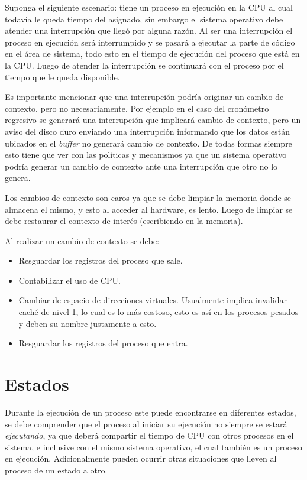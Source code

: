 Suponga el siguiente escenario: tiene un proceso en ejecución en la CPU al cual
todavía le queda tiempo del asignado, sin embargo el sistema operativo debe
atender una interrupción que llegó por alguna razón. Al ser una interrupción el
proceso en ejecución será interrumpido y se pasará a ejecutar la parte de código
en el área de sistema, todo esto en el tiempo de ejecución del proceso que está
en la CPU. Luego de atender la interrupción se continuará con el proceso por el
tiempo que le queda disponible.

Es importante mencionar que una interrupción podría originar un cambio de
contexto, pero no necesariamente. Por ejemplo en el caso del cronómetro
regresivo se generará una interrupción que implicará cambio de contexto, pero
un aviso del disco duro enviando una interrupción informando que los datos
están ubicados en el \textit{buffer} no generará cambio de contexto. De todas
formas siempre esto tiene que ver con las políticas y mecanismos ya que un
sistema operativo podría generar un cambio de contexto ante una interrupción que
otro no lo genera.

Los cambios de contexto son caros ya que se debe limpiar la memoria donde
se almacena el mismo, y esto al acceder al hardware, es lento. Luego de limpiar
se debe restaurar el contexto de interés (escribiendo en la memoria).

Al realizar un cambio de contexto se debe:
\begin{itemize}

	\item Resguardar los registros del proceso que sale.

	\item Contabilizar el uso de CPU.

	\item Cambiar de espacio de direcciones virtuales. Usualmente implica
	invalidar caché de nivel 1, lo cual es lo más costoso, esto es así en
	los procesos pesados y deben su nombre justamente a esto.

	\item Resguardar los registros del proceso que entra.

\end{itemize}

\section{Estados}
Durante la ejecución de un proceso este puede encontrarse en diferentes estados,
se debe comprender que el proceso al iniciar su ejecución no siempre se estará
\textit{ejecutando}, ya que deberá compartir el tiempo de CPU con otros procesos
en el sistema, e inclusive con el mismo sistema operativo, el cual también es un
proceso en ejecución. Adicionalmente pueden ocurrir otras situaciones que lleven
al proceso de un estado a otro.

